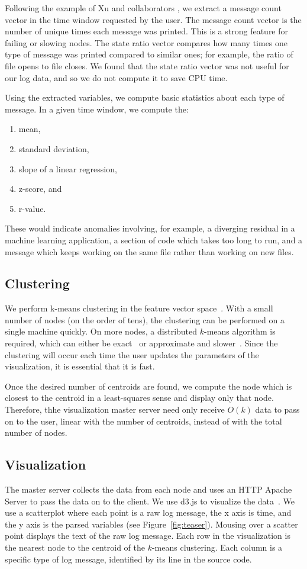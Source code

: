 \documentclass[conference]{style/acmsiggraph}
\begin{document}
Following the example of Xu and collaborators \cite{Xu09}, we extract a message count vector in the time window requested by the user.
The message count vector is the number of unique times each message was printed.
This is a strong feature for failing or slowing nodes.
The state ratio vector compares how many times one type of message was printed compared to similar ones; for example, the ratio of file opens to file closes.
We found that the state ratio vector was not useful for our log data, and so we do not compute it to save CPU time.

Using the extracted variables, we compute basic statistics about each type of message.
In a given time window, we compute the:
\begin{enumerate}
\item mean,
\item standard deviation,
\item slope of a linear regression,
\item z-score, and
\item r-value.
\end{enumerate}
These would indicate anomalies involving, for example, a diverging residual in a machine learning application, a section of code which takes too long to run, and a message which keeps working on the same file rather than working on new files.

\subsection{Clustering}
We perform k-means clustering in the feature vector space~\cite{kmeans,Lloyd82}.
With a small number of nodes (on the order of tens), the clustering can be performed on a single machine quickly.
On more nodes, a distributed $k$-means algorithm is required, which can either be exact~\cite{jin2006fast} or approximate and slower~\cite{kanungo2002local}.
Since the clustering will occur each time the user updates the parameters of the visualization, it is essential that it is fast.

Once the desired number of centroids are found, we compute the node which is closest to the centroid in a least-squares sense and display only that node.
Therefore, thhe visualization master server need only receive $O(k)$ data to pass on to the user, linear with the number of centroids, instead of with the total number of nodes.

\subsection{Visualization}
The master server collects the data from each node and uses an HTTP Apache Server to pass the data on to the client.
We use d3.js to visualize the data~\cite{D311}.
We use a scatterplot where each point is a raw log message, the x axis is time, and the y axis is the parsed variables (see Figure~\ref{fig:teaser}).
Mousing over a scatter point displays the text of the raw log message.
Each row in the visualization is the nearest node to the centroid of the $k$-means clustering.
Each column is a specific type of log message, identified by its line in the source code.
\end{document}
